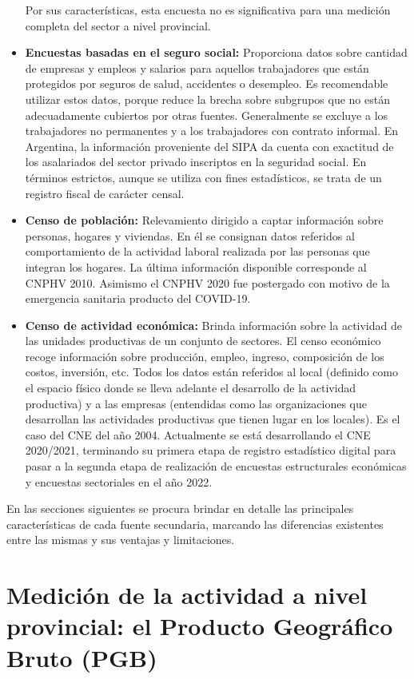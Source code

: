 \documentclass[
  openany]{book}
\begin{document}
\begin{itemize}
  Por sus características, esta encuesta no es significativa para una medición completa del sector a nivel provincial.
\item
  \textbf{Encuestas basadas en el seguro social:} Proporciona datos sobre cantidad de empresas y empleos y salarios para aquellos trabajadores que están protegidos por seguros de salud, accidentes o desempleo.
  Es recomendable utilizar estos datos, porque reduce la brecha sobre subgrupos que no están adecuadamente cubiertos por otras fuentes.
  Generalmente se excluye a los trabajadores no permanentes y a los trabajadores con contrato informal.
  En Argentina, la información proveniente del SIPA da cuenta con exactitud de los asalariados del sector privado inscriptos en la seguridad social.
  En términos estrictos, aunque se utiliza con fines estadísticos, se trata de un registro fiscal de carácter censal.
\item
  \textbf{Censo de población:} Relevamiento dirigido a captar información sobre personas, hogares y viviendas.
  En él se consignan datos referidos al comportamiento de la actividad laboral realizada por las personas que integran los hogares.
  La última información disponible corresponde al CNPHV 2010.
  Asimismo el CNPHV 2020 fue postergado con motivo de la emergencia sanitaria producto del COVID-19.
\item
  \textbf{Censo de actividad económica:} Brinda información sobre la actividad de las unidades productivas de un conjunto de sectores.
  El censo económico recoge información sobre producción, empleo, ingreso, composición de los costos, inversión, etc.
  Todos los datos están referidos al local (definido como el espacio físico donde se lleva adelante el desarrollo de la actividad productiva) y a las empresas (entendidas como las organizaciones que desarrollan las actividades productivas que tienen lugar en los locales).
  Es el caso del CNE del año 2004.
  Actualmente se está desarrollando el CNE 2020/2021, terminando su primera etapa de registro estadístico digital para pasar a la segunda etapa de realización de encuestas estructurales económicas y encuestas sectoriales en el año 2022.
\end{itemize}

En las secciones siguientes se procura brindar en detalle las principales características de cada fuente secundaria, marcando las diferencias existentes entre las mismas y sus ventajas y limitaciones.

\hypertarget{mediciuxf3n-de-la-actividad-a-nivel-provincial-el-producto-geogruxe1fico-bruto-pgb}{%
\section{Medición de la actividad a nivel provincial: el Producto Geográfico Bruto (PGB)}\label{mediciuxf3n-de-la-actividad-a-nivel-provincial-el-producto-geogruxe1fico-bruto-pgb}}
\end{document}

